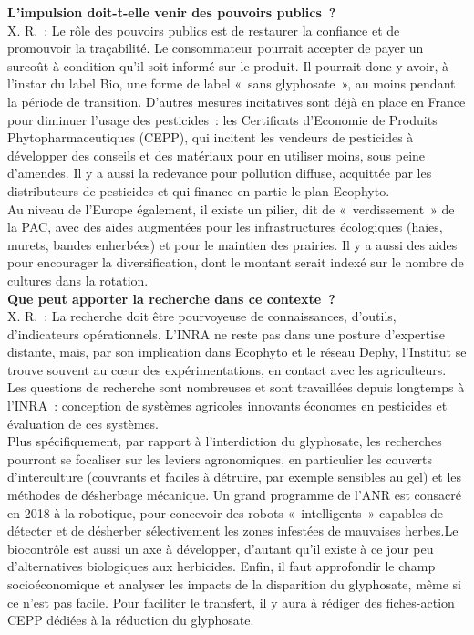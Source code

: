 \documentclass[8pt]{article}
\begin{document}
\textbf{L’impulsion doit-t-elle venir des pouvoirs publics~?}\\

X. R.~: Le rôle des pouvoirs publics est de restaurer la confiance et de promouvoir la traçabilité. Le consommateur pourrait accepter de payer un surcoût à condition qu’il soit informé sur le produit. Il pourrait donc y avoir, à l’instar du label Bio, une forme de label «~sans glyphosate~», au moins pendant la période de transition. D’autres mesures incitatives sont déjà en place en France pour diminuer l’usage des pesticides~: les Certificats d’Economie de Produits Phytopharmaceutiques (CEPP), qui incitent les vendeurs de pesticides à développer des conseils et des matériaux pour en utiliser moins, sous peine d’amendes. Il y a aussi la redevance pour pollution diffuse, acquittée par les distributeurs de pesticides et qui finance en partie le plan Ecophyto.\\

Au niveau de l’Europe également, il existe un pilier, dit de «~verdissement~» de la PAC, avec des aides augmentées pour les infrastructures écologiques (haies, murets, bandes enherbées) et pour le maintien des prairies. Il y a aussi des aides pour encourager la diversification, dont le montant serait indexé sur le nombre de cultures dans la rotation.\\

\textbf{Que peut apporter la recherche dans ce contexte~?}\\

X. R.~: La recherche doit être pourvoyeuse de connaissances, d’outils, d’indicateurs opérationnels. L’INRA ne reste pas dans une posture d’expertise distante, mais, par son implication dans Ecophyto et le réseau Dephy, l’Institut se trouve souvent au cœur des expérimentations, en contact avec les agriculteurs. Les questions de recherche sont nombreuses et sont travaillées depuis longtemps à l’INRA~: conception de systèmes agricoles innovants économes en pesticides et évaluation de ces systèmes.\\

Plus spécifiquement, par rapport à l’interdiction du glyphosate, les recherches pourront se focaliser sur les leviers agronomiques, en particulier les couverts d’interculture (couvrants et faciles à détruire, par exemple sensibles au gel) et les méthodes de désherbage mécanique. Un grand programme de l’ANR est consacré en 2018 à la robotique, pour concevoir des robots «~intelligents~» capables de détecter et de désherber sélectivement les zones infestées de mauvaises herbes.Le biocontrôle est aussi un axe à développer, d’autant qu’il existe à ce jour peu d’alternatives biologiques aux herbicides.
Enfin, il faut approfondir le champ socioéconomique et analyser les impacts de la disparition du glyphosate, même si ce n’est pas facile. Pour faciliter le transfert, il y aura à rédiger des fiches-action CEPP dédiées à la réduction du glyphosate.
\end{document}
